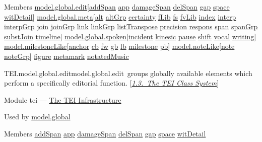 \begin{reflist}
    \item[{Members}]
  \hyperref[TEI.model.global.edit]{model.global.edit}[\hyperref[TEI.addSpan]{addSpan} \hyperref[TEI.app]{app} \hyperref[TEI.damageSpan]{damageSpan} \hyperref[TEI.delSpan]{delSpan} \hyperref[TEI.gap]{gap} \hyperref[TEI.space]{space} \hyperref[TEI.witDetail]{witDetail}] \hyperref[TEI.model.global.meta]{model.global.meta}[\hyperref[TEI.alt]{alt} \hyperref[TEI.altGrp]{altGrp} \hyperref[TEI.certainty]{certainty} \hyperref[TEI.fLib]{fLib} \hyperref[TEI.fs]{fs} \hyperref[TEI.fvLib]{fvLib} \hyperref[TEI.index]{index} \hyperref[TEI.interp]{interp} \hyperref[TEI.interpGrp]{interpGrp} \hyperref[TEI.join]{join} \hyperref[TEI.joinGrp]{joinGrp} \hyperref[TEI.link]{link} \hyperref[TEI.linkGrp]{linkGrp} \hyperref[TEI.listTranspose]{listTranspose} \hyperref[TEI.precision]{precision} \hyperref[TEI.respons]{respons} \hyperref[TEI.span]{span} \hyperref[TEI.spanGrp]{spanGrp} \hyperref[TEI.substJoin]{substJoin} \hyperref[TEI.timeline]{timeline}] \hyperref[TEI.model.global.spoken]{model.global.spoken}[\hyperref[TEI.incident]{incident} \hyperref[TEI.kinesic]{kinesic} \hyperref[TEI.pause]{pause} \hyperref[TEI.shift]{shift} \hyperref[TEI.vocal]{vocal} \hyperref[TEI.writing]{writing}] \hyperref[TEI.model.milestoneLike]{model.milestoneLike}[\hyperref[TEI.anchor]{anchor} \hyperref[TEI.cb]{cb} \hyperref[TEI.fw]{fw} \hyperref[TEI.gb]{gb} \hyperref[TEI.lb]{lb} \hyperref[TEI.milestone]{milestone} \hyperref[TEI.pb]{pb}] \hyperref[TEI.model.noteLike]{model.noteLike}[\hyperref[TEI.note]{note} \hyperref[TEI.noteGrp]{noteGrp}] \hyperref[TEI.figure]{figure} \hyperref[TEI.metamark]{metamark} \hyperref[TEI.notatedMusic]{notatedMusic}
\end{reflist}  
\begin{reflist}
\item[]\begin{specHead}{TEI.model.global.edit}{model.global.edit} groups globally available elements which perform a specifically editorial function. [\textit{\hyperref[STEC]{1.3.\ The TEI Class System}}]\end{specHead} 
    \item[{Module}]
  tei — \hyperref[ST]{The TEI Infrastructure}
    \item[{Used by}]
  \hyperref[TEI.model.global]{model.global}
    \item[{Members}]
  \hyperref[TEI.addSpan]{addSpan} \hyperref[TEI.app]{app} \hyperref[TEI.damageSpan]{damageSpan} \hyperref[TEI.delSpan]{delSpan} \hyperref[TEI.gap]{gap} \hyperref[TEI.space]{space} \hyperref[TEI.witDetail]{witDetail}
\end{reflist}  
